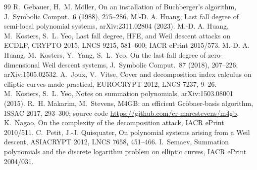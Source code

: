 \documentclass[11pt,a4paper]{article}
\theoremstyle{remark}\newtheorem{remark}{Remark}
\begin{document}
\begin{thebibliography}{99}
 R.~Gebauer, H.~M. Möller, On an installation of Buchberger's algorithm, J.~Symbolic Comput.\ 6 (1988), 275--286.
 M.-D. A. Huang, Last fall degree of semi-local polynomial systems, arXiv:2311.02804 (2023).
 M.-D. A. Huang, M.~Kosters, S.~L. Yeo, Last fall degree, HFE, and Weil descent attacks on ECDLP, CRYPTO 2015, LNCS 9215, 581--600; IACR ePrint 2015/573.
 M.-D. A. Huang, M.~Kosters, Y.~Yang, S.~L. Yeo, On the last fall degree of zero-dimensional Weil descent systems, J.~Symbolic Comput.\ 87 (2018), 207--226; arXiv:1505.02532.
 A.~Joux, V.~Vitse, Cover and decomposition index calculus on elliptic curves made practical, EUROCRYPT 2012, LNCS 7237, 9--26.
 M.~Kosters, S.~L. Yeo, Notes on summation polynomials, arXiv:1503.08001 (2015).
 R.~H. Makarim, M.~Stevens, M4GB: an efficient Gröbner-basis algorithm, ISSAC 2017, 293--300; source code \url{https://github.com/cr-marcstevens/m4gb}.
 K.~Nagao, On the complexity of the decomposition attack, IACR ePrint 2010/511.
 C.~Petit, J.-J. Quisquater, On polynomial systems arising from a Weil descent, ASIACRYPT 2012, LNCS 7658, 451--466.
 I.~Semaev, Summation polynomials and the discrete logarithm problem on elliptic curves, IACR ePrint 2004/031.
\end{thebibliography}
\end{document}

